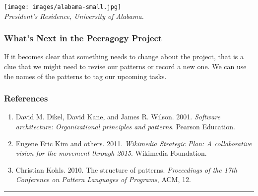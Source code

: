 \texttt{[image: images/alabama-small.jpg]}\\
\emph{President's Residence, University of Alabama.}

\hypertarget{whats-next-in-the-peeragogy-project}{%
\subsubsection{What's Next in the Peeragogy
Project}\label{whats-next-in-the-peeragogy-project}}

If it becomes clear that something needs to change about the project,
that is a clue that we might need to revise our patterns or record a new
one. We can use the names of the patterns to tag our upcoming tasks.

\hypertarget{references}{%
\subsubsection{References}\label{references}}

\begin{enumerate}
\def\labelenumi{\arabic{enumi}.}
\item
  David M. Dikel, David Kane, and James R. Wilson. 2001. \emph{Software
  architecture: Organizational principles and patterns}. Pearson
  Education.
\item
  Eugene Eric Kim and others. 2011. \emph{Wikimedia Strategic Plan: A
  collaborative vision for the movement through 2015}. Wikimedia
  Foundation.
\item
  Christian Kohls. 2010. The structure of patterns. \emph{Proceedings of
  the 17th Conference on Pattern Languages of Programs}, ACM, 12.
\end{enumerate}

\begin{center}\rule{0.5\linewidth}{0.5pt}\end{center}
